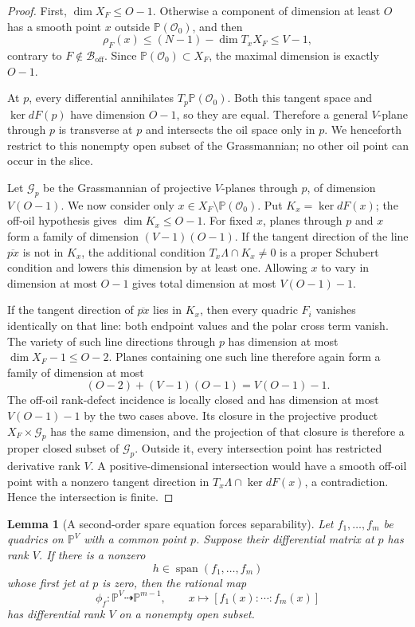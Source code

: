 \documentclass[10pt,a4paper]{article}
\newtheorem{lemma}[theorem]{Lemma}
\newcommand{\PP}{\mathbb P}
\newcommand{\cO}{\mathcal O}
\newcommand{\cB}{\mathcal B}
\newcommand{\Span}{\operatorname{span}}
\newcommand{\off}{\mathrm{off}}
\begin{document}
\begin{proof}
First, $\dim X_F\le O-1$.  Otherwise a component of dimension at least $O$ has a smooth point $x$ outside $\PP(\cO_0)$, and then
\[
\rho_F(x)\le (N-1)-\dim T_xX_F\le V-1,
\]
contrary to $F\notin\cB_{\off}$.  Since $\PP(\cO_0)\subset X_F$, the maximal dimension is exactly $O-1$.

At $p$, every differential annihilates $T_p\PP(\cO_0)$.  Both this tangent space and $\ker dF(p)$ have dimension $O-1$, so they are equal.  Therefore a general $V$-plane through $p$ is transverse at $p$ and intersects the oil space only in $p$.  We henceforth restrict to this nonempty open subset of the Grassmannian; no other oil point can occur in the slice.

Let $\mathcal G_p$ be the Grassmannian of projective $V$-planes through $p$, of dimension $V(O-1)$.  We now consider only $x\in X_F\setminus\PP(\cO_0)$.  Put $K_x=\ker dF(x)$; the off-oil hypothesis gives $\dim K_x\le O-1$.  For fixed $x$, planes through $p$ and $x$ form a family of dimension $(V-1)(O-1)$.  If the tangent direction of the line $\overline{px}$ is not in $K_x$, the additional condition $T_x\Lambda\cap K_x\ne0$ is a proper Schubert condition and lowers this dimension by at least one.  Allowing $x$ to vary in dimension at most $O-1$ gives total dimension at most $V(O-1)-1$.

If the tangent direction of $\overline{px}$ lies in $K_x$, then every quadric $F_i$ vanishes identically on that line: both endpoint values and the polar cross term vanish.  The variety of such line directions through $p$ has dimension at most $\dim X_F-1\le O-2$.  Planes containing one such line therefore again form a family of dimension at most
\[
(O-2)+(V-1)(O-1)=V(O-1)-1.
\]
The off-oil rank-defect incidence is locally closed and has dimension at most $V(O-1)-1$ by the two cases above.  Its closure in the projective product $X_F\times\mathcal G_p$ has the same dimension, and the projection of that closure is therefore a proper closed subset of $\mathcal G_p$.  Outside it, every intersection point has restricted derivative rank $V$.  A positive-dimensional intersection would have a smooth off-oil point with a nonzero tangent direction in $T_x\Lambda\cap\ker dF(x)$, a contradiction.  Hence the intersection is finite.
\end{proof}

\begin{lemma}[A second-order spare equation forces separability]\label{lem:second-order}
Let $f_1,\ldots,f_m$ be quadrics on $\PP^V$ with a common point $p$.  Suppose their differential matrix at $p$ has rank $V$.  If there is a nonzero
\[
h\in\Span(f_1,\ldots,f_m)
\]
whose first jet at $p$ is zero, then the rational map
\[
\phi_f:\PP^V\dashrightarrow\PP^{m-1},
\qquad
x\longmapsto[f_1(x):\cdots:f_m(x)]
\]
has differential rank $V$ on a nonempty open subset.
\end{lemma}
\end{document}
